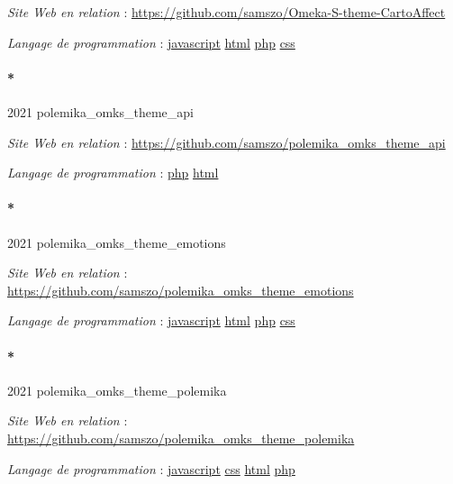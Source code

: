 \documentclass[
  a4paper,
  DIV=11,
  numbers=noendperiod]{scrreprt}
\let\oldparagraph\paragraph
\renewcommand{\paragraph}[1]{\oldparagraph{#1}\mbox{}}
\begin{document}
\emph{Site Web en relation} :
\url{https://github.com/samszo/Omeka-S-theme-CartoAffect}

\emph{Langage de programmation} :
\href{http://localhost/samszo/omk/s/fiches/item/89711}{javascript}
\href{http://localhost/samszo/omk/s/fiches/item/96621}{html}
\href{http://localhost/samszo/omk/s/fiches/item/108369}{php}
\href{http://localhost/samszo/omk/s/fiches/item/102418}{css}

\paragraph*{2021 polemika\_omks\_theme\_api}\label{sec-item301844}

\emph{Site Web en relation} :
\url{https://github.com/samszo/polemika_omks_theme_api}

\emph{Langage de programmation} :
\href{http://localhost/samszo/omk/s/fiches/item/108369}{php}
\href{http://localhost/samszo/omk/s/fiches/item/96621}{html}

\paragraph*{2021 polemika\_omks\_theme\_emotions}\label{sec-item301845}

\emph{Site Web en relation} :
\url{https://github.com/samszo/polemika_omks_theme_emotions}

\emph{Langage de programmation} :
\href{http://localhost/samszo/omk/s/fiches/item/89711}{javascript}
\href{http://localhost/samszo/omk/s/fiches/item/96621}{html}
\href{http://localhost/samszo/omk/s/fiches/item/108369}{php}
\href{http://localhost/samszo/omk/s/fiches/item/102418}{css}

\paragraph*{2021 polemika\_omks\_theme\_polemika}\label{sec-item301847}

\emph{Site Web en relation} :
\url{https://github.com/samszo/polemika_omks_theme_polemika}

\emph{Langage de programmation} :
\href{http://localhost/samszo/omk/s/fiches/item/89711}{javascript}
\href{http://localhost/samszo/omk/s/fiches/item/102418}{css}
\href{http://localhost/samszo/omk/s/fiches/item/96621}{html}
\href{http://localhost/samszo/omk/s/fiches/item/108369}{php}
\end{document}
